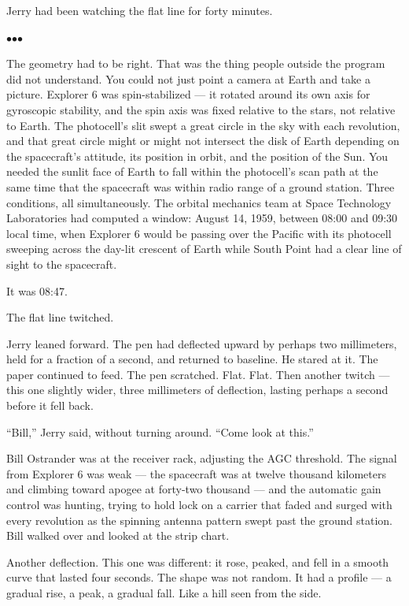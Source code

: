 \documentclass[12pt, letterpaper]{article}
\begin{document}
Jerry had been watching the flat line for forty minutes.

\bigskip
\centerline{$\bullet$\quad$\bullet$\quad$\bullet$}
\bigskip

The geometry had to be right. That was the thing people outside the program did not understand. You could not just point a camera at Earth and take a picture. Explorer 6 was spin-stabilized --- it rotated around its own axis for gyroscopic stability, and the spin axis was fixed relative to the stars, not relative to Earth. The photocell's slit swept a great circle in the sky with each revolution, and that great circle might or might not intersect the disk of Earth depending on the spacecraft's attitude, its position in orbit, and the position of the Sun. You needed the sunlit face of Earth to fall within the photocell's scan path at the same time that the spacecraft was within radio range of a ground station. Three conditions, all simultaneously. The orbital mechanics team at Space Technology Laboratories had computed a window: August 14, 1959, between 08:00 and 09:30 local time, when Explorer 6 would be passing over the Pacific with its photocell sweeping across the day-lit crescent of Earth while South Point had a clear line of sight to the spacecraft.

It was 08:47.

The flat line twitched.

Jerry leaned forward. The pen had deflected upward by perhaps two millimeters, held for a fraction of a second, and returned to baseline. He stared at it. The paper continued to feed. The pen scratched. Flat. Flat. Then another twitch --- this one slightly wider, three millimeters of deflection, lasting perhaps a second before it fell back.

``Bill,'' Jerry said, without turning around. ``Come look at this.''

Bill Ostrander was at the receiver rack, adjusting the AGC threshold. The signal from Explorer 6 was weak --- the spacecraft was at twelve thousand kilometers and climbing toward apogee at forty-two thousand --- and the automatic gain control was hunting, trying to hold lock on a carrier that faded and surged with every revolution as the spinning antenna pattern swept past the ground station. Bill walked over and looked at the strip chart.

Another deflection. This one was different: it rose, peaked, and fell in a smooth curve that lasted four seconds. The shape was not random. It had a profile --- a gradual rise, a peak, a gradual fall. Like a hill seen from the side.
\end{document}
